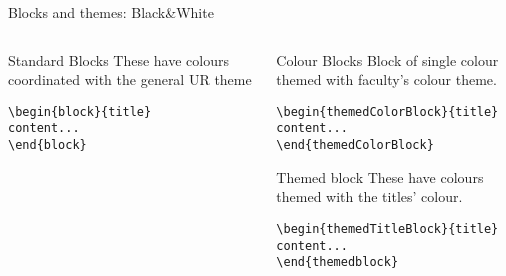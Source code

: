 \begingroup
{}
\begin{frame}[fragile]{Blocks and themes: Black\&White}
\begin{columns} %
\begin{column}{0.3\textwidth}
\begin{block}{Standard Blocks}
These have colours coordinated with the general UR theme
\begin{verbatim}
\begin{block}{title}
content...
\end{block}
\end{verbatim}
\end{block}
\end{column}
\begin{column}{0.7\textwidth}
\begin{themedColorBlock}{Colour Blocks}
Block of single colour themed with faculty's colour theme.
\small
\begin{verbatim}
\begin{themedColorBlock}{title}
content...
\end{themedColorBlock}
\end{verbatim}
\end{themedColorBlock}
\begin{themedTitleBlock} {Themed block}
These have colours themed with the titles' colour.
\small
\begin{verbatim}
\begin{themedTitleBlock}{title}
content...
\end{themedblock}
\end{verbatim}
\end{themedTitleBlock}
\end{column}
\end{columns}
\end{frame}
\endgroup


